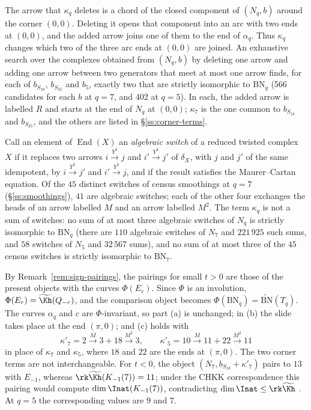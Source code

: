 \begin{remark}\label{rem:corner-term}
The arrow that $\kappa_q$ deletes is a chord of the closed component of $(N_q,b)$ around the corner
$(0,0)$.  Deleting it opens that component into an arc with two ends at $(0,0)$, and the added arrow
joins one of them to the end of $\alpha_q$.  Thus $\kappa_q$ changes which two of the three arc ends
at $(0,0)$ are joined.  An exhaustive search over the complexes obtained from
$(N_q,b)$ by deleting one arrow and adding one arrow between two generators that meet at most one
arrow finds, for each of $b_{S_{18}}$, $b_{S_{25}}$ and $b_5$, exactly two that are strictly
isomorphic to $\mathrm{BN}_q$ (566 candidates for each $b$ at $q=7$, and 402 at $q=5$).  In each, the
added arrow is labelled $R$ and starts at the end of $N_q$ at $(0,0)$; $\kappa_7$ is the one common
to $b_{S_{18}}$ and $b_{S_{25}}$, and the others are listed in \S\ref{ss:corner-terms}.

Call an element of $\operatorname{End}(X)$ an \emph{algebraic switch} of a reduced twisted complex
$X$ if it replaces two arrows $i\xrightarrow{Y^k}j$ and $i'\xrightarrow{Y^k}j'$ of $\delta_X$, with
$j$ and $j'$ of the same idempotent, by $i\xrightarrow{Y^k}j'$ and $i'\xrightarrow{Y^k}j$, and if the
result satisfies the Maurer--Cartan equation.  Of the $45$ distinct switches of census smoothings at
$q=7$ (\S\ref{ss:smoothings}), $41$ are algebraic switches; each of the other four exchanges the heads of
an arrow labelled $M$ and an arrow labelled $M^2$.  The term $\kappa_q$ is not a sum of switches: no sum
of at most three algebraic switches of $N_q$ is strictly isomorphic to $\mathrm{BN}_q$ (there are
$110$ algebraic switches of $N_7$ and $221\,925$ such sums, and $58$ switches of $N_5$ and $32\,567$
sums), and no sum of at most three of the $45$ census switches is strictly isomorphic to $\mathrm{BN}_7$.
\end{remark}

\begin{remark}\label{rem:sign-positive}
By Remark~\ref{rem:sign-pairings}, the pairings for small $t>0$ are those of the present objects with
the curves $\Phi(E_r)$.  Since $\Phi$ is an involution, $\Phi(E_r)=\widetilde{\Kh}(Q_{-r})$, and the
comparison object becomes $\Phi(\mathrm{BN}_q)=\widetilde{\mathrm{BN}}(T_q)$.  The curves $\alpha_q$
and $c$ are $\Phi$-invariant, so part (a) is unchanged; in (b) the slide takes place at the end
$(\pi,0)$; and (c) holds with
\[
 \kappa'_7=2\xrightarrow M3+18\xrightarrow{M^2}3,\qquad \kappa'_5=10\xrightarrow M11+22\xrightarrow{M^2}11
\]
in place of $\kappa_7$ and $\kappa_5$, where $18$ and $22$ are the ends at $(\pi,0)$.  The two corner
terms are not interchangeable.  For $t<0$, the object $(N_7,b_{S_{18}}+\kappa'_7)$ pairs to $13$
with $E_{-1}$, whereas $\rk\widetilde{\Kh}(K_{-1}(7))=11$; under the CHKK correspondence this
pairing would compute $\dim\Inat(K_{-1}(7))$, contradicting $\dim\Inat\le\rk\widetilde{\Kh}$
\cite{KM2}.  At $q=5$ the corresponding values are $9$ and $7$.
\end{remark}

